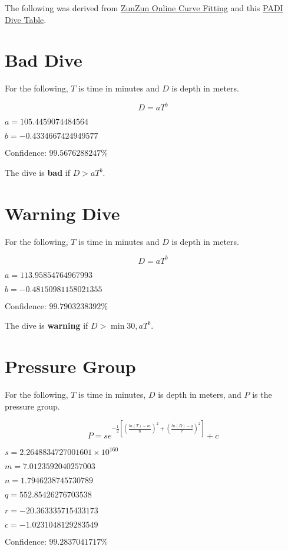 \documentclass[17pt]{article}
\begin{document}
The following was derived from \href{http://zunzun.com/}{ZunZun Online Curve Fitting} and this \href{http://www.orka.lt/img/planner.jpg}{PADI Dive Table}.

\section{Bad Dive}

For the following, $T$ is time in minutes and $D$ is depth in meters.

$$D = aT^b$$

$a = 105.4459074484564$

$b = -0.4334667424949577$

Confidence: $99.5676288247\%$

The dive is \textbf{bad} if $D > aT^b$.

\section{Warning Dive}

For the following, $T$ is time in minutes and $D$ is depth in meters.

$$D = aT^b$$

$a = 113.95854764967993$

$b = -0.48150981158021355$

Confidence: $99.7903238392\%$

The dive is \textbf{warning} if $D > \min 30, aT^b$.

\newpage

\section{Pressure Group}

For the following, $T$ is time in minutes, $D$ is depth in meters, and $P$ is the pressure group.

$$P = se^{-\frac{1}{2}\left[\left(\frac{ln(T) - m}{n}\right)^2 + \left(\frac{ln(D) - q}{r}\right)^2\right]} + c$$

$s = 2.2648834727001601 \times 10^{160}$

$m = 7.0123592040257003$

$n = 1.7946238745730789$

$q = 552.85426276703538$

$r = -20.363335715433173$

$c = -1.0231048129283549$

Confidence: $99.2837041717\%$
\end{document}
